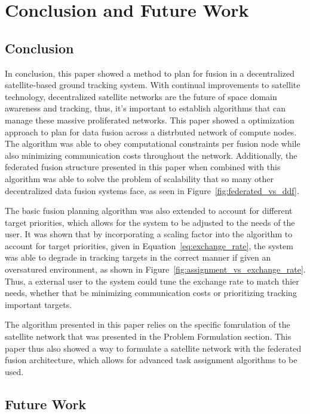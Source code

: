 \section{Conclusion and Future Work}
\subsection{Conclusion}

In conclusion, this paper showed a method to plan for fusion in a decentralized satellite-based ground tracking system. 
With continual improvements to satellite technology, decentralized satellite networks are the future of space domain awareness and tracking, thus, it's important to establish algorithms that can manage these massive proliferated networks.
This paper showed a optimization approach to plan for data fusion across a distrbuted network of compute nodes.
The algorithm was able to obey computational constraints per fusion node while also minimizing communication costs throughout the network.
Additionally, the federated fusion structure presented in this paper when combined with this algorithm was able to solve the problem of scalability that so many other decentralized data fusion systems face, as seen in Figure~\ref{fig:federated_vs_ddf}.

The basic fusion planning algorithm was also extended to account for different target priorities, which allows for the system to be adjusted to the needs of the user.
It was shown that by incorporating a scaling factor into the algorithm to account for target priorities, given in Equation~\eqref{eq:exchange_rate}, the system was able to degrade in tracking targets in the correct manner if given an oversatured environment, as shown in Figure~\ref{fig:assignment_vs_exchange_rate}.
Thus, a external user to the system could tune the exchange rate to match thier needs, whether that be minimizing communication costs or prioritizing tracking important targets.

The algorithm presented in this paper relies on the specific fomrulation of the satellite network that was presented in the Problem Formulation section.
This paper thus also showed a way to formulate a satellite network with the federated fusion architecture, which allows for advanced task assignment algorithms to be used.

\subsection{Future Work}

